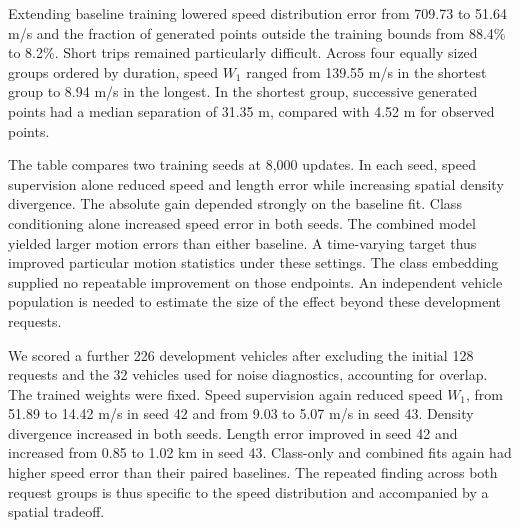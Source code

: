 Extending baseline training lowered speed distribution error from 709.73 to 51.64 m/s and the fraction of generated points outside the training bounds from 88.4\% to 8.2\%. Short trips remained particularly difficult. Across four equally sized groups ordered by duration, speed $W_1$ ranged from 139.55 m/s in the shortest group to 8.94 m/s in the longest. In the shortest group, successive generated points had a median separation of 31.35 m, compared with 4.52 m for observed points.

The table compares two training seeds at 8,000 updates. In each seed, speed supervision alone reduced speed and length error while increasing spatial density divergence. The absolute gain depended strongly on the baseline fit. Class conditioning alone increased speed error in both seeds. The combined model yielded larger motion errors than either baseline. A time-varying target thus improved particular motion statistics under these settings. The class embedding supplied no repeatable improvement on those endpoints. An independent vehicle population is needed to estimate the size of the effect beyond these development requests.

We scored a further 226 development vehicles after excluding the initial 128 requests and the 32 vehicles used for noise diagnostics, accounting for overlap. The trained weights were fixed. Speed supervision again reduced speed $W_1$, from 51.89 to 14.42 m/s in seed 42 and from 9.03 to 5.07 m/s in seed 43. Density divergence increased in both seeds. Length error improved in seed 42 and increased from 0.85 to 1.02 km in seed 43. Class-only and combined fits again had higher speed error than their paired baselines. The repeated finding across both request groups is thus specific to the speed distribution and accompanied by a spatial tradeoff.
